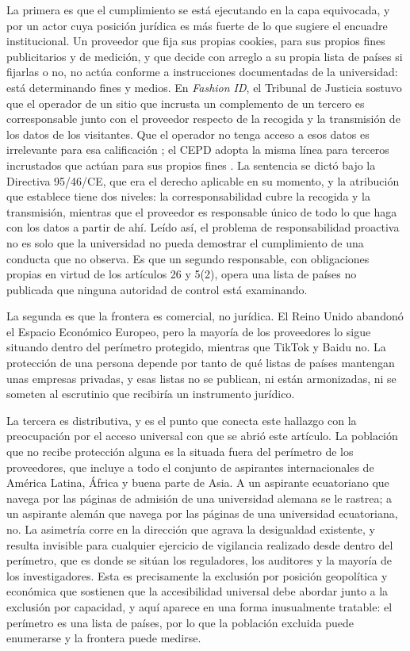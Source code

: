 \documentclass[pdflatex,sn-basic,Numbered,iicol]{sn-jnl}
\theoremstyle{thmstyleone}
\theoremstyle{thmstyletwo}
\theoremstyle{thmstylethree}
\begin{document}
La primera es que el cumplimiento se est\'a ejecutando en la capa equivocada, y por un actor cuya posici\'on jur\'idica es m\'as fuerte de lo que sugiere el encuadre institucional. Un proveedor que fija sus propias cookies, para sus propios fines publicitarios y de medici\'on, y que decide con arreglo a su propia lista de pa\'ises si fijarlas o no, no act\'ua conforme a instrucciones documentadas de la universidad: est\'a determinando fines y medios. En \emph{Fashion ID}, el Tribunal de Justicia sostuvo que el operador de un sitio que incrusta un complemento de un tercero es corresponsable junto con el proveedor respecto de la recogida y la transmisi\'on de los datos de los visitantes. Que el operador no tenga acceso a esos datos es irrelevante para esa calificaci\'on \citep{cjeu2019fashionid}; el CEPD adopta la misma l\'inea para terceros incrustados que act\'uan para sus propios fines \citep{edpb2021controller}. La sentencia se dict\'o bajo la Directiva 95/46/CE, que era el derecho aplicable en su momento, y la atribuci\'on que establece tiene dos niveles: la corresponsabilidad cubre la recogida y la transmisi\'on, mientras que el proveedor es responsable \'unico de todo lo que haga con los datos a partir de ah\'i. Le\'ido as\'i, el problema de responsabilidad proactiva no es solo que la universidad no pueda demostrar el cumplimiento de una conducta que no observa. Es que un segundo responsable, con obligaciones propias en virtud de los art\'iculos 26 y 5(2), opera una lista de pa\'ises no publicada que ninguna autoridad de control est\'a examinando.

La segunda es que la frontera es comercial, no jur\'idica. El Reino Unido abandon\'o el Espacio Econ\'omico Europeo, pero la mayor\'ia de los proveedores lo sigue situando dentro del per\'imetro protegido, mientras que TikTok y Baidu no. La protecci\'on de una persona depende por tanto de qu\'e listas de pa\'ises mantengan unas empresas privadas, y esas listas no se publican, ni est\'an armonizadas, ni se someten al escrutinio que recibir\'ia un instrumento jur\'idico.

La tercera es distributiva, y es el punto que conecta este hallazgo con la preocupaci\'on por el acceso universal con que se abri\'o este art\'iculo. La poblaci\'on que no recibe protecci\'on alguna es la situada fuera del per\'imetro de los proveedores, que incluye a todo el conjunto de aspirantes internacionales de Am\'erica Latina, \'Africa y buena parte de Asia. A un aspirante ecuatoriano que navega por las p\'aginas de admisi\'on de una universidad alemana se le rastrea; a un aspirante alem\'an que navega por las p\'aginas de una universidad ecuatoriana, no. La asimetr\'ia corre en la direcci\'on que agrava la desigualdad existente, y resulta invisible para cualquier ejercicio de vigilancia realizado desde dentro del per\'imetro, que es donde se sit\'uan los reguladores, los auditores y la mayor\'ia de los investigadores. Esta es precisamente la exclusi\'on por posici\'on geopol\'itica y econ\'omica que \citet{abascal2016rethinking} sostienen que la accesibilidad universal debe abordar junto a la exclusi\'on por capacidad, y aqu\'i aparece en una forma inusualmente tratable: el per\'imetro es una lista de pa\'ises, por lo que la poblaci\'on excluida puede enumerarse y la frontera puede medirse.
\end{document}
